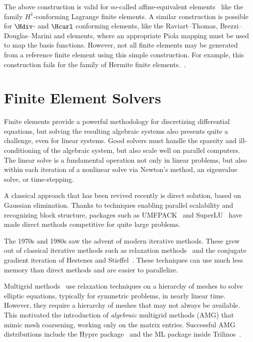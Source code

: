 The above construction is valid for so-called affine-equivalent
elements~\cite{BrennerScott2008} like the family $H^1$-conforming
Lagrange finite elements. A similar construction is possible for
$\Hdiv$- and $\Hcurl$ conforming elements, like the Raviart--Thomas,
Brezzi--Douglas--Marini and \nedelec{} elements, where an appropriate
Piola mapping must be used to map the basis functions. However, not
all finite elements may be generated from a reference finite element
using this simple construction. For example, this construction fails
for the family of Hermite finite
elements.~\cite{Ciarlet2002,BrennerScott2008}.

\section{Finite Element Solvers}

Finite elements provide a powerful methodology for discretizing
differential equations, but solving the resulting algebraic systems
also presents quite a challenge, even for linear systems.  Good
solvers must handle the sparsity and ill-conditioning of the algebraic
system, but also scale well on parallel computers.  The linear solve
is a fundamental operation not only in linear problems, but also
within each iteration of a nonlinear solve via Newton's method, an
eigenvalue solve, or time-stepping.

A classical approach that has been revived recently is direct
solution, based on Gaussian elimination.  Thanks to techniques
enabling parallel scalability and recognizing block structure,
packages such as UMFPACK~\cite{Davis2004} and SuperLU~\cite{Li2005}
have made direct methods competitive for quite large problems.

The 1970s and 1980s saw the advent of modern iterative methods.  These
grew out of classical iterative methods such as relaxation
methods~\cite{missing} and the conjugate gradient iteration of
Hestenes and Stieffel~\cite{HestenesStiefel1952}. These techniques can
use much less memory than direct methods and are easier to
parallelize.


Multigrid methods~\cite{Brandt1977,Wesseling1992} use relaxation
techniques on a hierarchy of meshes to solve elliptic equations,
typically for symmetric problems, in nearly linear time.  However,
they require a hierarchy of meshes that may not always be available.
This motivated the introduction of \emph{algebraic} multigrid methods
(AMG) that mimic mesh coarsening, working only on the matrix entries.
Successful AMG distributions include the Hypre
package~\cite{FalgoutYang2002} and the ML package inside
Trilinos~\cite{HerouxBartlettEtAl2005}.


